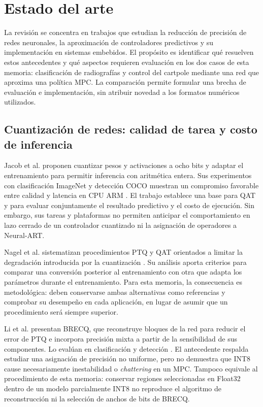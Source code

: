 \chapter{Estado del arte}\label{cap:estado}
La revisión se concentra en trabajos que estudian la reducción de precisión de redes neuronales, la aproximación de controladores predictivos y su implementación en sistemas embebidos. El propósito es identificar qué resuelven estos antecedentes y qué aspectos requieren evaluación en los dos casos de esta memoria: clasificación de radiografías y control del cartpole mediante una red que aproxima una política MPC. La comparación permite formular una brecha de evaluación e implementación, sin atribuir novedad a los formatos numéricos utilizados.

\section{Cuantización de redes: calidad de tarea y costo de inferencia}
Jacob et al. proponen cuantizar pesos y activaciones a ocho bits y adaptar el entrenamiento para permitir inferencia con aritmética entera. Sus experimentos con clasificación ImageNet y detección COCO muestran un compromiso favorable entre calidad y latencia en CPU ARM \cite{jacob2018}. El trabajo establece una base para QAT y para evaluar conjuntamente el resultado predictivo y el costo de ejecución. Sin embargo, sus tareas y plataformas no permiten anticipar el comportamiento en lazo cerrado de un controlador cuantizado ni la asignación de operadores a Neural-ART.

Nagel et al. sistematizan procedimientos PTQ y QAT orientados a limitar la degradación introducida por la cuantización \cite{nagel2021}. Su análisis aporta criterios para comparar una conversión posterior al entrenamiento con otra que adapta los parámetros durante el entrenamiento. Para esta memoria, la consecuencia es metodológica: deben conservarse ambas alternativas como referencias y comprobar su desempeño en cada aplicación, en lugar de asumir que un procedimiento será siempre superior.

Li et al. presentan BRECQ, que reconstruye bloques de la red para reducir el error de PTQ e incorpora precisión mixta a partir de la sensibilidad de sus componentes. Lo evalúan en clasificación y detección \cite{brecq2021}. El antecedente respalda estudiar una asignación de precisión no uniforme, pero no demuestra que INT8 cause necesariamente inestabilidad o \emph{chattering} en un MPC. Tampoco equivale al procedimiento de esta memoria: conservar regiones seleccionadas en Float32 dentro de un modelo parcialmente INT8 no reproduce el algoritmo de reconstrucción ni la selección de anchos de bits de BRECQ.

